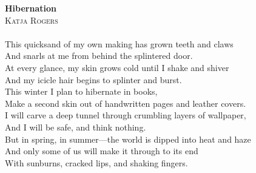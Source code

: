 \documentclass[11pt]{article}
\begin{document}
\thispagestyle{empty}

\textbf{Hibernation}\\
\textsc{Katja Rogers}\\
\ \\

This quicksand of my own making has grown teeth and claws\\
And snarls at me from behind the splintered door.\\
At every glance, my skin grows cold until I shake and shiver\\
And my icicle hair begins to splinter and burst.\\

This winter I plan to hibernate in books,\\
Make a second skin out of handwritten pages and leather covers.\\
I will carve a deep tunnel through crumbling layers of wallpaper,\\
And I will be safe, and think nothing.\\

But in spring, in summer---the world is dipped into heat and haze\\
And only some of us will make it through to its end\\
With sunburns, cracked lips, and shaking fingers.

\fontsize{40pt}{40pt}
\selectfont 
\vspace{0.4cm}
\hspace{2.7cm}
\color{light-gray}
\end{document}
